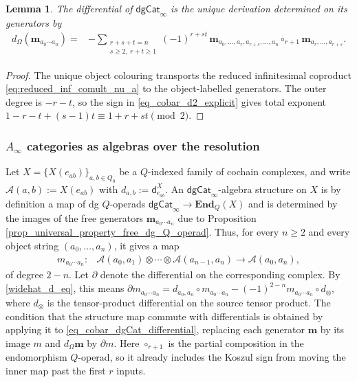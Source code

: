 \documentclass[11pt,letterpaper]{article}
\numberwithin{equation}{section}
\theoremstyle{plain}
\newtheorem{lem}[thm]{Lemma}
\theoremstyle{definition}
\theoremstyle{remark}
\begin{document}
	\begin{lem}
		\label{lem_cobar_dgCat_differential}
		The differential of $\mathsf{dgCat}_\infty$ is the unique derivation
		determined on its generators by
		\begin{equation}
			\label{eq_cobar_dgCat_differential}
			\begin{aligned}
				d_\Omega(\mathbf m_{a_0\cdots a_n})
				={}&-
				\sum_{\substack{
						r+s+t=n\\
						s\geq2,\ r+t\geq1
				}}
				(-1)^{r+st}
				\,
				\mathbf m_{a_0,\ldots,a_r,a_{r+s},\ldots,a_n}
				\circ_{r+1}
				\mathbf m_{a_r,\ldots,a_{r+s}}.
			\end{aligned}
		\end{equation}
	\end{lem}

	\begin{proof}
The unique object colouring transports the reduced infinitesimal
coproduct \eqref{eq:reduced_inf_comult_nu_a} to the object-labelled generators.
The outer degree is $-r-t$, so the sign in
\eqref{eq_cobar_d2_explicit} gives total exponent
$1-r-t+(s-1)t\equiv1+r+st\pmod2$.
\end{proof}

	\subsubsection{\texorpdfstring{$A_\infty$}{A-infinity} categories as algebras over the resolution}

	Let $X=\{X(e_{ab})\}_{a,b\in Q_0}$ be a $Q$-indexed family of
	cochain complexes, and write
	$	\mathcal A(a,b):=X(e_{ab})$ with
	$	d_{a,b}:=\mathsf d^X_{e_{ab}}$.
	An $\mathsf{dgCat}_\infty$-algebra structure on $X$ is by definition a map of dg $Q$-operads $\mathsf{dgCat}_\infty\to \mathbf{End}_Q(X)$ and is determined by the
	images of the free generators $\mathbf m_{a_0\cdots a_n}$ due to Proposition \ref{prop_universal_property_free_dg_Q_operad}. Thus, for every $n\geq2$ and every object
	string $(a_0,\ldots,a_n)$, it gives a map
	\[
	\begin{aligned}
		m_{a_0\cdots a_n}:{}
		&\mathcal A(a_0,a_1)\otimes\cdots\otimes
		\mathcal A(a_{n-1},a_n)
		\longrightarrow
		\mathcal A(a_0,a_n),
	\end{aligned}
	\]
	of degree $2-n$.
	Let $\partial$ denote the differential on the corresponding complex. By \eqref{widehat_d_eq}, this means
	$
	\partial m_{a_0\cdots a_n}
	=
	d_{a_0,a_n}\circ m_{a_0\cdots a_n}
	-
	(-1)^{2-n}
	m_{a_0\cdots a_n}\circ d_{\otimes},
	$
	where $d_{\otimes}$ is the tensor-product differential on the source tensor product.
	The condition that the structure map commute with differentials is obtained by
	applying it to \eqref{eq_cobar_dgCat_differential}, replacing each generator
	$\mathbf m$ by its image $m$ and $d_\Omega\mathbf m$ by $\partial m$.
	Here $\circ_{r+1}$ is the partial composition in the endomorphism
	$Q$-operad, so it already includes the Koszul sign from moving the inner
	map past the first $r$ inputs.
\end{document}
